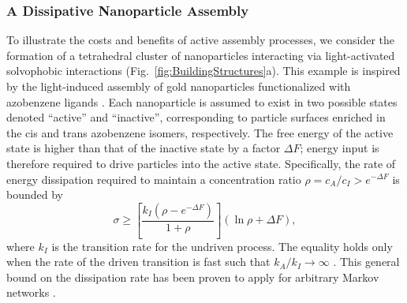 \begin{appendices}
\subsubsection{A Dissipative Nanoparticle Assembly}

To illustrate the costs and benefits of active assembly processes, we consider the formation of a tetrahedral cluster of nanoparticles interacting via light-activated solvophobic interactions (Fig.~\ref{fig:BuildingStructures}a). This example is inspired by the light-induced assembly of gold nanoparticles functionalized with azobenzene ligands \autocite{klajn2007light}.  Each nanoparticle is assumed to exist in two possible states denoted ``active'' and ``inactive'', corresponding to particle surfaces enriched in the cis and trans azobenzene isomers, respectively.  The free energy of the active state is higher than that of the inactive state by a factor $\Delta F$; energy input is therefore required to drive particles into the active state.  Specifically, the rate of energy dissipation required to maintain a concentration ratio $\rho=c_A/c_I> e^{-\Delta F}$ is bounded by 
\begin{equation}
    \sigma \geq \left[\frac{ k_I (\rho - e^{-\Delta F})}{1+\rho}\right] (\ln\rho+\Delta F),
\end{equation}
where $k_I$ is the transition rate for the undriven process. The equality holds only when the rate of the driven transition is fast such that $k_A/k_I\rightarrow \infty$ \autocite{Horowitz2017}. This general bound on the dissipation rate has been proven to apply for arbitrary Markov networks \autocite{Horowitz2017}.


\end{appendices}

